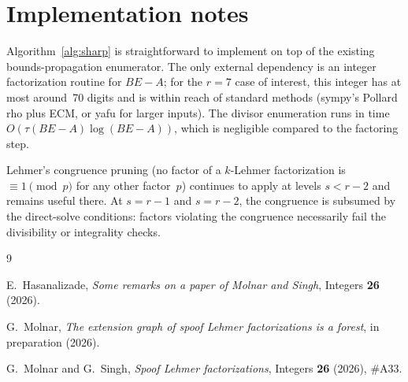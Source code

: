 \documentclass[11pt]{article}
\theoremstyle{definition}
\theoremstyle{remark}
\begin{document}
\section{Implementation notes}

Algorithm~\ref{alg:sharp} is straightforward to implement on top of the
existing bounds-propagation enumerator.  The only external dependency is
an integer factorization routine for $BE - A$; for the $r = 7$ case of
interest, this integer has at most around~70 digits and is within reach
of standard methods (sympy's Pollard rho plus ECM, or yafu for larger
inputs).  The divisor enumeration runs in time
$O(\tau(BE - A) \log(BE - A))$, which is negligible compared to the
factoring step.

Lehmer's congruence pruning (no factor of a $k$-Lehmer factorization is
$\equiv 1 \pmod{p}$ for any other factor~$p$) continues to apply at
levels $s < r - 2$ and remains useful there.  At $s = r - 1$ and
$s = r - 2$, the congruence is subsumed by the direct-solve conditions:
factors violating the congruence necessarily fail the divisibility or
integrality checks.

\begin{thebibliography}{9}

E.~Hasanalizade, \emph{Some remarks on a paper of Molnar and Singh},
Integers \textbf{26} (2026).

G.~Molnar, \emph{The extension graph of spoof Lehmer factorizations is a
forest}, in preparation (2026).

G.~Molnar and G.~Singh, \emph{Spoof Lehmer factorizations}, Integers
\textbf{26} (2026), \#A33.

\end{thebibliography}
\end{document}
